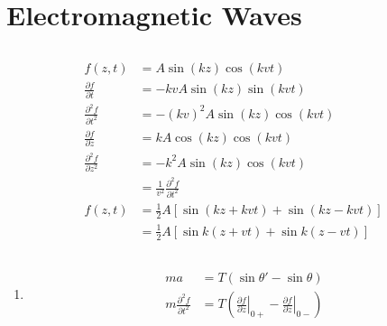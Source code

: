 \documentclass{article}
\begin{document}
\section{Electromagnetic Waves}

\setcounter{subsection}{1}
\subsection{}

\begin{align*}
  f(z, t)                           & = A \sin (k z) \cos (k v t)                               \\
  \frac{\partial f}{\partial t}     & = -k v A \sin (k z) \sin (k v t)                          \\
  \frac{\partial^2 f}{\partial t^2} & = -(k v)^2 A \sin (k z) \cos (k v t)                      \\
  \frac{\partial f}{\partial z}     & = k A \cos (k z) \cos (k v t)                             \\
  \frac{\partial^2 f}{\partial z^2} & = -k^2 A \sin (k z) \cos (k v t)                          \\
                                    & = \frac{1}{v^2} \frac{\partial^2 f}{\partial t^2}         \\
  f(z, t)                           & = \frac{1}{2} A [\sin (k z + k v t) + \sin (k z - k v t)] \\
                                    & = \frac{1}{2} A [\sin k (z + v t) + \sin k (z - v t)]
\end{align*}

\setcounter{subsection}{5}
\subsection{}

\begin{enumerate}
  \item

        \begin{align*}
          m a                                 & = T (\sin \theta' - \sin \theta)                                                                                         \\
          m \frac{\partial^2 f}{\partial t^2} & = T \left( \left. \frac{\partial f}{\partial z} \right|_{0+} - \left. \frac{\partial f}{\partial z} \right|_{0-} \right)
        \end{align*}
\end{enumerate}
\end{document}
